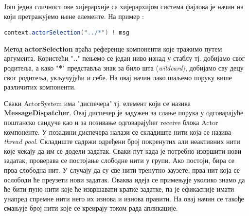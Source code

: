 \documentclass[12pt,oneside]{memoir}
\begin{document}
Још једна сличност ове хијерархије са хијерархијом система фајлова је начин на који претражујемо њене елементе. На пример \cite{akkaDoc}:
\begin{lstlisting}[language=Scala]
context.actorSelection("../*") ! msg
\end{lstlisting}
Метод \textbf{actorSelection} враћа референце компоненти које тражимо путем аргумента. Користећи "\textbf{..}" пењемо се један ниво изнад у стаблу тј. добијамо свог родитеља, а како "\textbf{*}" представља знак за било шта (\textit{wildcard}), добијамо сву децу свог родитеља, укључујући и себе. На овај начин лако шаљемо поруку више различитих компоненти.
\\
\par Сваки ActorSystem има "диспечера" тј. елемент који се назива \textbf{MessageDispatcher}. Овај диспечер је задужен за слање порука у одговарајуће поштанско сандуче као и за позивање одговарајућег receive блока Actor компоненте. У позадини диспечера налази се складиште нити која се назива \textit{thread pool}. Складиште садржи одређени број покренутих али неактивних нити које чекају да им се додели задатак. Сваки пут када је потребно извршити нови задатак, проверава се постојање слободне нити у групи. Ако постоји, бира се прва слободна нит. У случају да су све нити тренутно заузете, прва нит која се ослободи ће преузети нови задатак. Оваква идеја се примењује уколико знамо да ће бити пуно нити које ће извршавати кратке задатке, па је ефикасније имати унапред спремне нити него их изнова и изнова правити. На овај начин се такође смањује број нити које се креирају током рада апликације.
\end{document}
